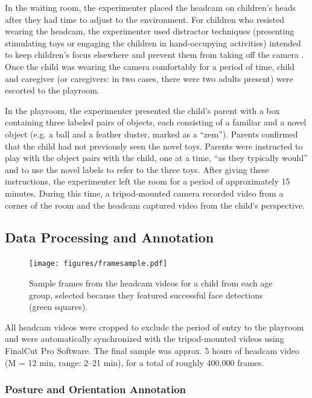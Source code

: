 \documentclass[10pt,letterpaper]{article}
\begin{document}
In the waiting room, the experimenter placed the headcam on children's heads after they had time to adjust to the environment. For children who resisted wearing the headcam, the experimenter used distractor techniques (presenting stimulating toys or engaging the children in hand-occupying activities) intended to keep children's focus elsewhere and prevent them from taking off the camera \cite{yoshida2008}. Once the child was wearing the camera comfortably for a period of time, child and caregiver (or caregivers: in two cases, there were two adults present) were escorted to the playroom. 

In the playroom, the experimenter presented the child's parent with a box containing three labeled pairs of objects, each consisting of a familiar and a novel object (e.g. a ball and a feather duster, marked as a ``zem''). Parents confirmed that the child had not previously seen the novel toys. Parents were instructed to play with the object pairs with the child, one at a time, ``as they typically would'' and to use the novel labels to refer to the three toys. After giving these instructions, the experimenter left the room for a period of approximately 15 minutes. During this time, a tripod-mounted camera recorded video from a corner of the room and the headcam captured video from the child's perspective. 

\subsection{Data Processing and Annotation}

\begin{figure}
\texttt{[image: figures/framesample.pdf]}
\caption{\label{fig:frames} Sample frames from the headcam videos for a child from each age group, selected because they featured successful face detections (green squares).} 
\end{figure}

All headcam videos were cropped to exclude the period of entry to the playroom and were automatically synchronized with the tripod-mounted videos using FinalCut Pro Software. The final sample was approx. 5 hours of headcam video (M = 12 min, range: 2--21 min), for a total of roughly 400,000 frames. 

\subsubsection{Posture and Orientation Annotation}
\end{document}
